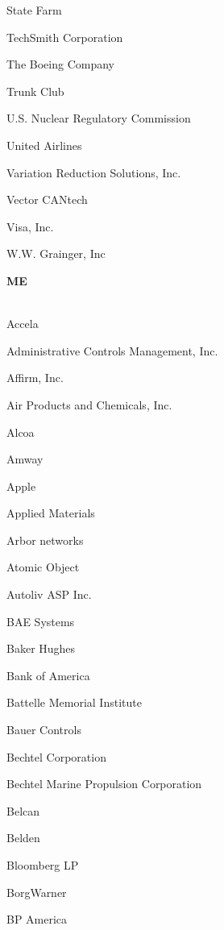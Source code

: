 \documentclass[twoside]{article}
\begin{document}
\begin{center}
\begin{multicols}{5}
\begin{FlushLeft}
\begin{compactitem}
\item State Farm
\item TechSmith Corporation
\item The Boeing Company
\item Trunk Club
\item U.S. Nuclear Regulatory Commission
\item United Airlines
\item Variation Reduction Solutions, Inc.
\item Vector CANtech
\item Visa, Inc.
\item W.W. Grainger, Inc
\end{compactitem}
        \end{FlushLeft}
        \vspace{1em}
        {\fontsize{14}{16}\selectfont \bf ME}\\
        \vspace{-1em}
        ~\hrulefill~
        \vspace{-.9em}
        \begin{FlushLeft}
        \begin{compactitem}
        \item Accela
\item Administrative Controls Management, Inc.
\item Affirm, Inc.
\item Air Products and Chemicals, Inc.
\item Alcoa
\item Amway
\item Apple
\item Applied Materials
\item Arbor networks
\item Atomic Object
\item Autoliv ASP Inc.
\item BAE Systems
\item Baker Hughes
\item Bank of America
\item Battelle Memorial Institute
\item Bauer Controls
\item Bechtel Corporation
\item Bechtel Marine Propulsion Corporation
\item Belcan
\item Belden
\item Bloomberg LP
\item BorgWarner
\item BP America

\end{compactitem}
\end{FlushLeft}
\end{multicols}
\end{center}
\end{document}
